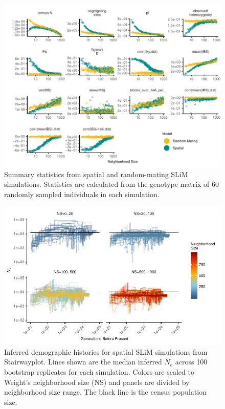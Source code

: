 \documentclass[9pt,twocolumn,twoside,lineno]{gsajnl}
\begin{document}
\begin{figure}[p]
\centering
\includegraphics[width=\textwidth]{sumstats_by_sigma.pdf}
\caption{Summary statistics from spatial and random-mating SLiM simulations. Statistics are calculated from the genotype matrix of 60 randomly sampled individuals in each simulation.}
\label{fig:spectrum}
\end{figure}

\afterpage{\clearpage}
\begin{figure}[p]
\centering
\includegraphics[width=\textwidth]{stairwayplot_by_sigma_facets.pdf}
\caption{Inferred demographic histories for spatial SLiM simulations from Stairwayplot. Lines shown are the median inferred $N_{e}$ across 100 bootstrap replicates for each simulation. Colors are scaled to Wright's neighborhood size (NS) and panels are divided by neighborhood size range. The black line is the census population size.}
\label{fig:spectrum}
\end{figure}
\end{document}

